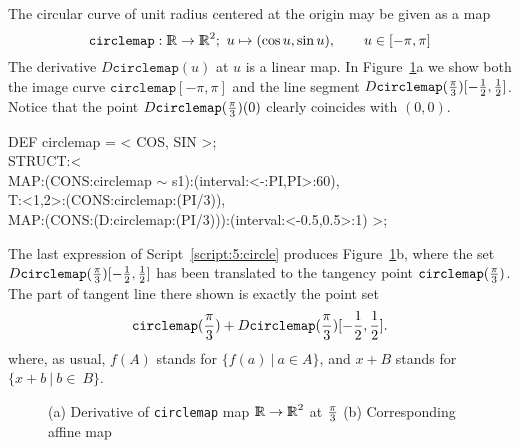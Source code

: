 \documentclass{31x47jw}
\begin{document}
\begin{example}
    
The circular curve of unit radius centered at the origin may be given
as a map 
\[
\texttt{circlemap} :\mathbb{I\!\!R}\rightarrow\mathbb{I\!\!R}^{2} ;\ u\mapsto (\cos u, \sin u), 
\qquad u\in [-\pi,\pi]
\]
The derivative $D \texttt{circlemap}(u)$ at $u$ is a linear map.  In
Figure~\ref{figure:5:ex2}a we show both the image curve
$\texttt{circlemap}[-\pi,\pi]$ and the line segment $D
\texttt{circlemap}({\pi\over 3})[-{1\over 2},{1\over 2}]$.  Notice that
the point $D \texttt{circlemap}({\pi\over 3})(0)$ clearly coincides with
$(0,0)$.
    
\begin{script}
\begin{smallplasm} 
DEF circlemap  = < COS, SIN >;\\[0.3cm]

STRUCT:<\+\\
  MAP:(CONS:circlemap $\sim$ s1):(interval:<-:PI,PI>:60),\\
  T:<1,2>:(CONS:circlemap:(PI/3)),\\
  MAP:(CONS:(D:circlemap:(PI/3))):(interval:<-0.5,0.5>:1) >;
\end{smallplasm} 
\label{script:5:circle}
\end{script}

The last expression of Script~\ref{script:5:circle} produces
Figure~\ref{figure:5:ex2}b, where the set $D
\texttt{circlemap}({\pi\over 3})[-{1\over 2},{1\over 2}]$ has been
translated to the tangency point $\texttt{circlemap}({\pi\over 3})$. 
The part of tangent line there shown is exactly the point set
\[
\texttt{circlemap}({\pi\over 3}) + D
\texttt{circlemap}({\pi\over 3})[-{1\over 2},{1\over 2}].
\]
where, as usual, $f(A)$ stands for $\{ f(a)\ |\ a\in A \}$, and $x + B$
stands for $\{x + b\ |\ b\in~B\}$.


\begin{figure}[htb]
\centering
{}
\hspace{2.5cm}
\caption{(a) Derivative of \texttt{circlemap} map $\mathbb{I\!\!R}\rightarrow\mathbb{I\!\!R}^{2}$ at
$\pi\over 3$ (b) Corresponding affine map
\label{figure:5:ex2}}
\end{figure}

\end{example}
\end{document}
